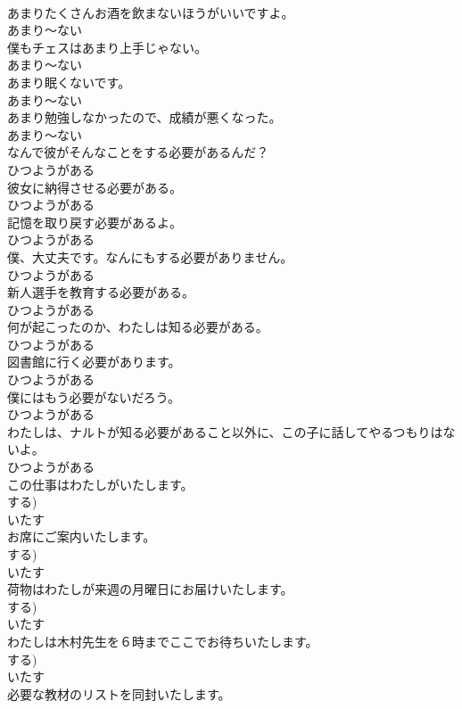 \documentclass[8pt]{extreport}
\begin{document}
\begin{CJK}{UTF8}{min}
\\	あまりたくさんお酒を飲まないほうがいいですよ。	
\\	あまり～ない
\\	僕もチェスはあまり上手じゃない。	
\\	あまり～ない
\\	あまり眠くないです。	
\\	あまり～ない
\\	あまり勉強しなかったので、成績が悪くなった。	
\\	あまり～ない
\\	なんで彼がそんなことをする必要があるんだ？	
\\	ひつようがある
\\	彼女に納得させる必要がある。	
\\	ひつようがある
\\	記憶を取り戻す必要があるよ。	
\\	ひつようがある
\\	僕、大丈夫です。なんにもする必要がありません。	
\\	ひつようがある
\\	新人選手を教育する必要がある。	
\\	ひつようがある
\\	何が起こったのか、わたしは知る必要がある。	
\\	ひつようがある
\\	図書館に行く必要があります。	
\\	ひつようがある
\\	僕にはもう必要がないだろう。	
\\	ひつようがある
\\	わたしは、ナルトが知る必要があること以外に、この子に話してやるつもりはないよ。	
\\	ひつようがある
\\	この仕事はわたしがいたします。	
\\	する)	
\\	いたす
\\	お席にご案内いたします。	
\\	する)	
\\	いたす
\\	荷物はわたしが来週の月曜日にお届けいたします。	
\\	する)	
\\	いたす
\\	わたしは木村先生を６時までここでお待ちいたします。	
\\	する)	
\\	いたす
\\	必要な教材のリストを同封いたします。	

\end{CJK}
\end{document}
